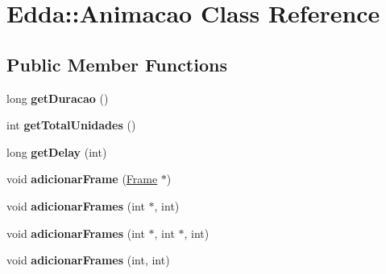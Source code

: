\hypertarget{class_edda_1_1_animacao}{
\section{Edda::Animacao Class Reference}
\label{class_edda_1_1_animacao}
}
\subsection*{Public Member Functions}
\begin{DoxyCompactItemize}
\item 
\hypertarget{class_edda_1_1_animacao_a8e93855aa667f7d249a41dcdc9ee8762}{
long {\bfseries getDuracao} ()}
\label{class_edda_1_1_animacao_a8e93855aa667f7d249a41dcdc9ee8762}

\item 
\hypertarget{class_edda_1_1_animacao_a60df33cc7ca86e9b2718632bd09fb2e0}{
int {\bfseries getTotalUnidades} ()}
\label{class_edda_1_1_animacao_a60df33cc7ca86e9b2718632bd09fb2e0}

\item 
\hypertarget{class_edda_1_1_animacao_adaca55e71720c0d1f98b9e4ef4a92bf0}{
long {\bfseries getDelay} (int)}
\label{class_edda_1_1_animacao_adaca55e71720c0d1f98b9e4ef4a92bf0}

\item 
\hypertarget{class_edda_1_1_animacao_a7714c3bd40eb8dc29ee7ab940bcf8f28}{
void {\bfseries adicionarFrame} (\hyperlink{class_edda_1_1_frame}{Frame} $\ast$)}
\label{class_edda_1_1_animacao_a7714c3bd40eb8dc29ee7ab940bcf8f28}

\item 
\hypertarget{class_edda_1_1_animacao_a64577e0a5b52359bc3881f8e84de0f7e}{
void {\bfseries adicionarFrames} (int $\ast$, int)}
\label{class_edda_1_1_animacao_a64577e0a5b52359bc3881f8e84de0f7e}

\item 
\hypertarget{class_edda_1_1_animacao_a77a1235c16fd5988bfd81d5fdd211f6f}{
void {\bfseries adicionarFrames} (int $\ast$, int $\ast$, int)}
\label{class_edda_1_1_animacao_a77a1235c16fd5988bfd81d5fdd211f6f}

\item 
\hypertarget{class_edda_1_1_animacao_a4a8dbfd437d9e76ee09399bc4ec0584d}{
void {\bfseries adicionarFrames} (int, int)}
\label{class_edda_1_1_animacao_a4a8dbfd437d9e76ee09399bc4ec0584d}

\end{DoxyCompactItemize}

